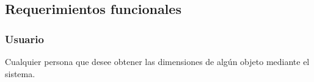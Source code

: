 \subsection{Requerimientos funcionales}
\subsubsection{Usuario}
Cualquier persona que desee obtener las dimensiones de algún objeto mediante el sistema.